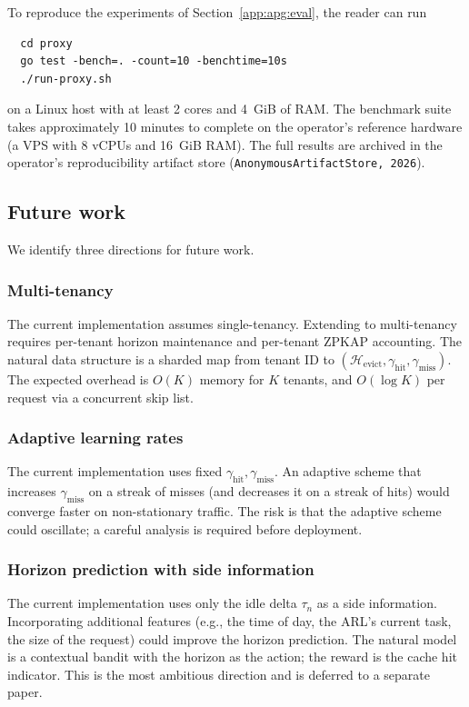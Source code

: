 \noindent
To reproduce the experiments of
Section~\ref{app:apg:eval}, the reader can run
\begin{verbatim}
  cd proxy
  go test -bench=. -count=10 -benchtime=10s
  ./run-proxy.sh
\end{verbatim}
on a Linux host with at least 2 cores and 4~GiB of RAM. The
benchmark suite takes approximately 10 minutes to complete on
the operator's reference hardware (a VPS with 8 vCPUs and
16~GiB RAM). The full results are archived in the operator's
reproducibility artifact store
(\texttt{AnonymousArtifactStore, 2026}).

\subsection{Future work}
\label{app:apg:future}

We identify three directions for future work.

\subsubsection{Multi-tenancy}

The current implementation assumes single-tenancy.
Extending to multi-tenancy requires per-tenant horizon
maintenance and per-tenant ZPKAP accounting. The natural
data structure is a sharded map from tenant ID to
$(\mathcal{H}_{\text{evict}}, \gamma_{\text{hit}},
\gamma_{\text{miss}})$. The expected overhead is $O(K)$
memory for $K$ tenants, and $O(\log K)$ per request via a
concurrent skip list.

\subsubsection{Adaptive learning rates}

The current implementation uses fixed
$\gamma_{\text{hit}}, \gamma_{\text{miss}}$. An adaptive
scheme that increases $\gamma_{\text{miss}}$ on a streak of
misses (and decreases it on a streak of hits) would
converge faster on non-stationary traffic. The risk is
that the adaptive scheme could oscillate; a careful
analysis is required before deployment.

\subsubsection{Horizon prediction with side information}

The current implementation uses only the idle delta
$\tau_n$ as a side information. Incorporating additional
features (e.g., the time of day, the ARL's current task, the
size of the request) could improve the horizon prediction.
The natural model is a contextual bandit with the horizon as
the action; the reward is the cache hit indicator. This is
the most ambitious direction and is deferred to a separate
paper.

